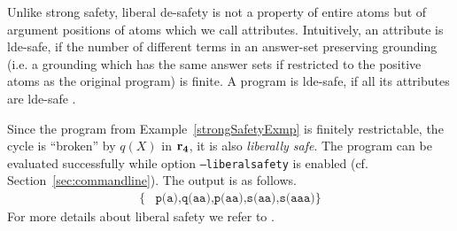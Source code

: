 \documentclass[a4paper, titlepage]{article}
\newcommand{\row}[1]{%
  \ensuremath{\color{black}\ensuremath{\mathbf{#1}} \color{black}}%
}
\begin{document}
Unlike strong safety, liberal de-safety is not a property of entire atoms but of argument positions of atoms which we call attributes.
Intuitively, an attribute is lde-safe, if the number of different terms in
an answer-set preserving grounding (i.e. a grounding which has the same answer sets if restricted to the
positive atoms as the original program) is finite. A program is lde-safe, if all its attributes are lde-safe \cite{efikrs2015}.

Since the program from Example~\ref{strongSafetyExmp} is finitely restrictable, the cycle is ``broken'' by $\mathit{q(X)}$ in $\row{r_4}$, it is also \emph{liberally safe}.
The program can be evaluated successfully while option \texttt{--liberalsafety} is enabled (cf. Section~\ref{sec:commandline}). The output is as follows.
\begin{align*}
\{ & 
\texttt{p(a),q(aa),p(aa),s(aa),s(aaa)}
\}
\end{align*}
For more details about liberal safety we refer to \cite{eite-etal-14a}.



\end{document}
